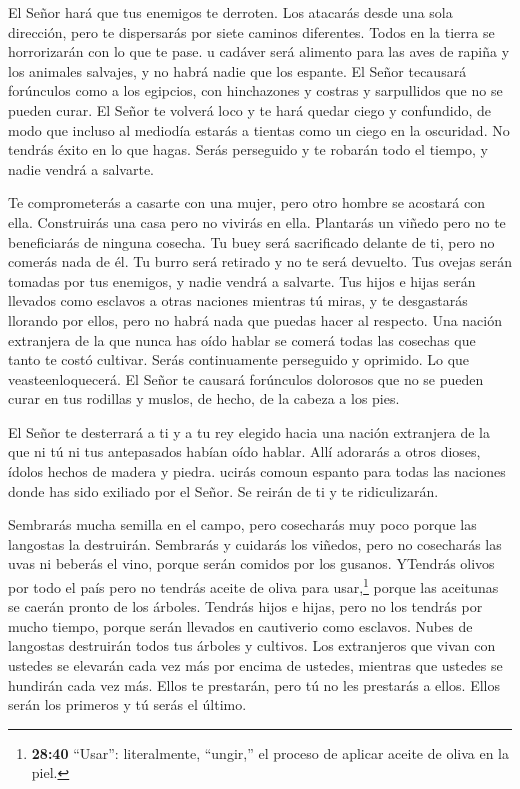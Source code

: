  El Señor hará que tus enemigos te derroten. Los atacarás
desde una sola dirección, pero te dispersarás por siete caminos
diferentes. Todos en la tierra se horrorizarán con lo que te pase.
 u cadáver será alimento para las aves de rapiña y los
animales salvajes, y no habrá nadie que los espante.  El
Señor tecausará forúnculos como a los egipcios, con hinchazones y
costras y sarpullidos que no se pueden curar.  El Señor te
volverá loco y te hará quedar ciego y confundido,  de modo
que incluso al mediodía estarás a tientas como un ciego en la oscuridad.
No tendrás éxito en lo que hagas. Serás perseguido y te robarán todo el
tiempo, y nadie vendrá a salvarte.

 Te comprometerás a casarte con una mujer, pero otro hombre
se acostará con ella. Construirás una casa pero no vivirás en ella.
Plantarás un viñedo pero no te beneficiarás de ninguna cosecha.
 Tu buey será sacrificado delante de ti, pero no comerás
nada de él. Tu burro será retirado y no te será devuelto. Tus ovejas
serán tomadas por tus enemigos, y nadie vendrá a salvarte. 
Tus hijos e hijas serán llevados como esclavos a otras naciones mientras
tú miras, y te desgastarás llorando por ellos, pero no habrá nada que
puedas hacer al respecto.  Una nación extranjera de la que
nunca has oído hablar se comerá todas las cosechas que tanto te costó
cultivar. Serás continuamente perseguido y oprimido.  Lo
que veasteenloquecerá.  El Señor te causará forúnculos
dolorosos que no se pueden curar en tus rodillas y muslos, de hecho, de
la cabeza a los pies.

 El Señor te desterrará a ti y a tu rey elegido hacia una
nación extranjera de la que ni tú ni tus antepasados habían oído hablar.
Allí adorarás a otros dioses, ídolos hechos de madera y piedra.
 ucirás comoun espanto para todas las naciones donde has
sido exiliado por el Señor. Se reirán de ti y te ridiculizarán.

 Sembrarás mucha semilla en el campo, pero cosecharás muy
poco porque las langostas la destruirán.  Sembrarás y
cuidarás los viñedos, pero no cosecharás las uvas ni beberás el vino,
porque serán comidos por los gusanos.  YTendrás olivos por
todo el país pero no tendrás aceite de oliva para usar,\footnote{\textbf{28:40}
  ``Usar'': literalmente, ``ungir,'' el proceso de aplicar aceite de
  oliva en la piel.} porque las aceitunas se caerán pronto de los
árboles.  Tendrás hijos e hijas, pero no los tendrás por
mucho tiempo, porque serán llevados en cautiverio como esclavos.
 Nubes de langostas destruirán todos tus árboles y
cultivos.  Los extranjeros que vivan con ustedes se
elevarán cada vez más por encima de ustedes, mientras que ustedes se
hundirán cada vez más.  Ellos te prestarán, pero tú no les
prestarás a ellos. Ellos serán los primeros y tú serás el último.

